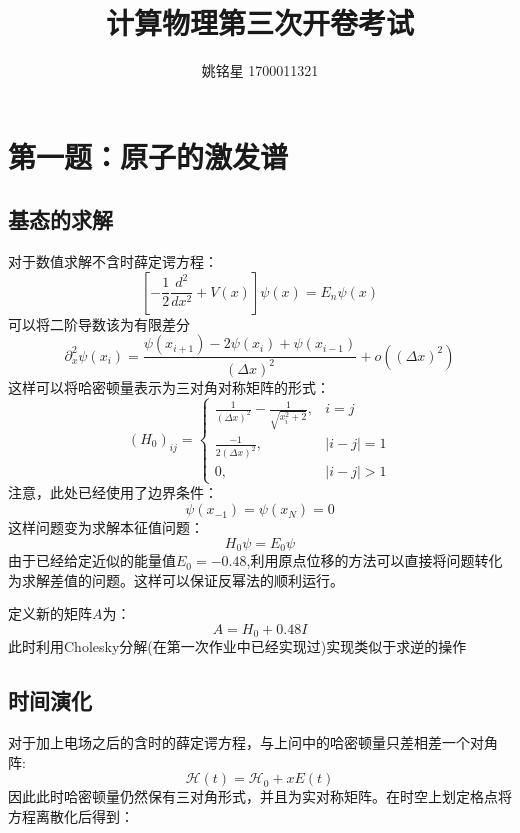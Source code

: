 \documentclass[a4paper]{ctexart}
\title{计算物理第三次开卷考试}
\author{姚铭星 1700011321}
\date{}
\begin{document}
\maketitle
\section{第一题：原子的激发谱}
\subsection{基态的求解}
对于数值求解不含时薛定谔方程：
\begin{equation}
\left[-\frac{1}{2} \frac{d^{2}}{d x^{2}}+V(x)\right] \psi(x)=E_{n} \psi(x)
\end{equation}
可以将二阶导数该为有限差分
\begin{equation}
\partial_{x}^{2} \psi\left(x_{i}\right)=\frac{\psi\left(x_{i+1}\right)-2 \psi\left(x_{i}\right)+\psi\left(x_{i-1}\right)}{(\Delta x)^{2}}+o\left((\Delta x)^{2}\right)
\end{equation}
这样可以将哈密顿量表示为三对角对称矩阵的形式：
\begin{equation}
\left(H_{0}\right)_{i j}=\left\{\begin{array}{ll}{\frac{1}{(\Delta x)^{2}}-\frac{1}{\sqrt{x_{i}^{2}+2}},} & {i=j} \\ {\frac{-1}{2(\Delta x)^{2}},} & {|i-j|=1} \\ {0,} & {|i-j|>1}\end{array}\right.
\end{equation}
注意，此处已经使用了边界条件：
\begin{equation}
\psi(x_{-1})=\psi(x_{N})=0
\end{equation}
这样问题变为求解本征值问题：
\begin{equation}
H_0\psi = E_0 \psi
\end{equation}
由于已经给定近似的能量值$E_0=-0.48$,利用原点位移的方法可以直接将问题转化为求解差值的问题。这样可以保证反幂法的顺利运行。

定义新的矩阵$A$为：
\begin{equation}
A = H_0 + 0.48I
\end{equation}
此时利用Cholesky分解(在第一次作业中已经实现过)实现类似于求逆的操作

\subsection{时间演化}
对于加上电场之后的含时的薛定谔方程，与上问中的哈密顿量只差相差一个对角阵:
\begin{equation}
\mathcal{H}(t)=\mathcal{H}_{0}+x E(t)
\end{equation}
因此此时哈密顿量仍然保有三对角形式，并且为实对称矩阵。在时空上划定格点将方程离散化后得到：
\end{document}
